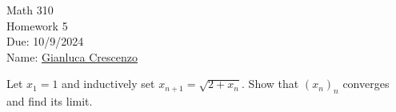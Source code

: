 \documentclass[10pt,twoside,openany]{memoir}
\begin{document}
\begin{center}
    { \Large Math 310 \\[0.1in]Homework 5 \\[0.1in]
    Due: 10/9/2024}\\[.25in]
    { Name:} {\underline{Gianluca Crescenzo\hspace*{2in}}}\\[0.15in]
    \end{center}
    \vspace{4pt}
    \begin{exercise}
        Let $x_1 = 1$ and inductively set $x_{n+1} = \sqrt{2 +x_n}$. Show that $(x_n)_n$ converges and find its limit.
    \end{exercise}
\end{document}
